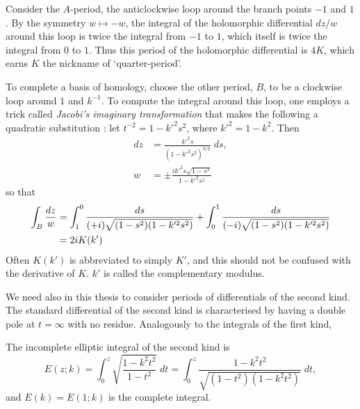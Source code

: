 
Consider the $A$-period, the anticlockwise loop around the branch points $-1$ and $1$. By the symmetry $w \mapsto -w$, the integral of the holomorphic differential $dz / w $ around this loop is twice the integral from $-1$ to $1$, which itself is twice the integral from $0$ to $1$. Thus this period of the holomorphic differential is $4K$, which earns $K$ the nickname of `quarter-period'.


To complete a basis of homology, choose the other period, $B$, to be a clockwise loop around $1$ and $k^{-1}$. To compute the integral around this loop, one employs a trick called {\it Jacobi's imaginary transformation} that makes the following a quadratic substitution \cite{Whittaker2000}: let $t^{-2} = 1-k'^2 s^2$, where $k'^2 = 1 - k^2$. Then
\begin{align*}
dz &= \frac{k'^2 s}{(1-k'^2 s^2)^{3/2}}\;ds, \\
w &= \pm \frac{i k'^2 s \sqrt {1-s^2}}{1-k'^2 s^2}
\end{align*}
so that
\begin{align*}
\int_B \frac{dz}{w}
&= \int_1^0 \frac{ds}{(+i)\sqrt{(1-s^2)(1-k'^2 s^2)}} + \int_0^1 \frac{ds}{(-i)\sqrt{(1-s^2)(1-k'^2 s^2)}}\\
&= 2i K(k')
\end{align*}
Often $K(k')$ is abbreviated to simply $K'$, and this should not be confused with the derivative of $K$. $k'$ is called the complementary modulus.


We need also in this thesis to consider periods of differentials of the second kind. The standard differential of the second kind is characterised by having a double pole at $t=\infty$ with no residue. Analogously to the integrals of the first kind,

\begin{defn}
The incomplete elliptic integral of the second kind is
\[
E(z;k) = \int_0^z \sqrt{\frac{1-k^2 t^2}{1-t^2}} \;dt = \int_0^z \frac{1-k^2 t^2}{\sqrt{(1-t^2)(1-k^2 t^2)}}\;dt,
\]
and $E(k) = E(1;k)$ is the complete integral.
\end{defn}

